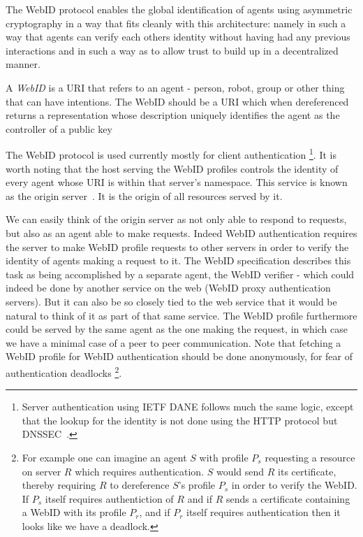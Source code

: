 \documentclass[a4paper]{llncs}
\begin{document}
The WebID protocol enables the global identification of agents using asymmetric cryptography in a way that fits cleanly with this architecture:
namely in such a way that agents can verify each others identity without having had any previous interactions and in such a way as to allow trust to build up in a decentralized manner.

A \textit{WebID} is a URI that refers to an agent - person, robot, group or other thing that can have intentions.
The WebID should be a URI which when dereferenced returns a representation whose description uniquely identifies the agent as the controller of a public key~\cite{sporny-m-2011--a,story-h-2009--a}

The WebID protocol is used currently mostly for client authentication%
\footnote{Server authentication using IETF DANE follows much the same logic, except that the lookup for the identity is not done using the HTTP protocol but DNSSEC~\cite{hoffman-p-2012--a}.}.
It is worth noting that the host serving the WebID profiles controls the identity of every agent whose URI is within that server's namespace.
This service is known as the origin server~\cite{barth-a-2011--a}.
It is the origin of all resources served by it. 

We can easily think of the origin server as not only able to respond to requests, but also as an agent able to make requests.
Indeed WebID authentication requires the server to make WebID profile requests to other servers in order to verify the identity of agents making a request to it.
The WebID specification describes this task as being accomplished by a separate agent, the WebID verifier - which could indeed be done by another service on the web (WebID proxy authentication servers).
But it can also be so closely tied to the web service that it would be natural to think of it as part of that same service.
The WebID profile furthermore could be served by the same agent as the one making the request, in which case we have a minimal case of a peer to peer communication.
Note that fetching a WebID profile for WebID authentication should be done anonymously, for fear of authentication deadlocks%
\footnote{For example one can imagine an agent $S$ with profile $P_s$ requesting a resource on server $R$ which requires authentication.
$S$ would send $R$ its certificate, thereby requiring $R$ to dereference $S$'s profile $P_s$ in order to verify the WebID.
If $P_s$ itself requires authentiction of $R$ and if $R$ sends a certificate containing a WebID with its profile $P_r$, and if $P_r$ itself requires authentication then it looks like we have a deadlock.}.
\end{document}
